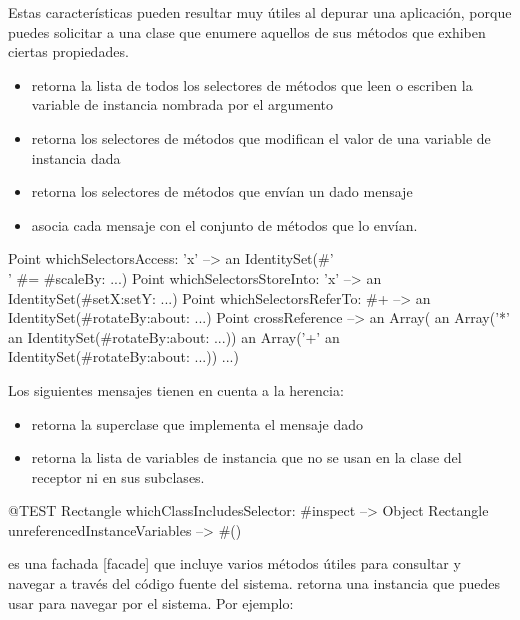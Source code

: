 \documentclass[a4paper,10pt,twoside]{book}
\begin{document}
Estas características pueden resultar muy útiles al depurar una
aplicación, porque puedes solicitar a una clase que enumere aquellos
de sus métodos que exhiben ciertas propiedades.
\begin{itemize}
\item {} retorna la lista de
  todos los selectores de métodos que leen o escriben la variable de
  instancia nombrada por el argumento
\item {} retorna los
  selectores de métodos que modifican el valor de una variable de
  instancia dada
\item {} retorna los selectores
  de métodos que envían un dado mensaje
\item {} asocia cada mensaje con el
  conjunto de métodos que lo envían.
\end{itemize}

\begin{code}{} %
Point whichSelectorsAccess: 'x'    --> an IdentitySet(#'\\' #= #scaleBy: ...)
Point whichSelectorsStoreInto: 'x' --> an IdentitySet(#setX:setY: ...)
Point whichSelectorsReferTo: #+  --> an IdentitySet(#rotateBy:about: ...)
Point crossReference --> an Array(
                an Array('*' an IdentitySet(#rotateBy:about: ...))
                an Array('+' an IdentitySet(#rotateBy:about: ...))
                ...)
\end{code}

Los siguientes mensajes tienen en cuenta a la herencia:

\begin{itemize}
\item {} retorna la
  superclase que implementa el mensaje dado
\item {} retorna la
  lista de variables de instancia que no se usan en la clase del
  receptor ni en sus subclases.
\end{itemize}

\begin{code}{@TEST}
Rectangle whichClassIncludesSelector: #inspect --> Object
Rectangle unreferencedInstanceVariables            --> #()
\end{code}

 es una fachada [facade] que incluye varios
métodos útiles para consultar y navegar a través del código fuente del
sistema.    retorna una instancia que puedes usar para navegar
por el sistema.  Por ejemplo:
\end{document}
